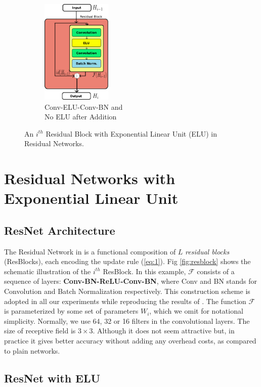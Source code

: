 \documentclass[10pt,twocolumn,letterpaper]{article}
\begin{document}
\begin{figure}
    \begin{subfigure}{.24\linewidth}
        \centering
        \includegraphics[height=5cm]{ELUBlock}
        \caption{Conv-ELU-Conv-BN and \\ No ELU after Addition}
        \label{fig:Conv-ELU-Conv-BN2}
    \end{subfigure}
    \caption{An \(i^{th}\) Residual Block with Exponential Linear Unit (ELU) in Residual Networks.}
    \label{fig:ELUBlocks}
\end{figure}

\section{Residual Networks with Exponential Linear Unit}
\subsection{ResNet Architecture}

The Residual Network in \cite{[1]} is a functional composition of \(L\) \emph{residual blocks} (ResBlocks), each encoding the update rule (\ref{eq:1}). Fig \ref{fig:resblock} shows the schematic illustration of the \(i^{th}\) ResBlock. In this example, \(\mathcal{F}\) consists of a sequence of layers: \textbf{Conv-BN-ReLU-Conv-BN}, where Conv and BN stands for Convolution and Batch Normalization respectively. This construction scheme is adopted in all our experiments while reproducing the results of \cite{[1]}. The function \(\mathcal{F}\) is parameterized by some set of  parameters \(W_i\), which we omit for notational simplicity. Normally, we use  64, 32 or 16 filters in the convolutional layers. The size of receptive field is $3 \times 3$. Although it does not seem attractive but, in practice it gives better accuracy without adding any overhead costs, as compared to plain networks.

\subsection{ResNet with ELU}
\end{document}
